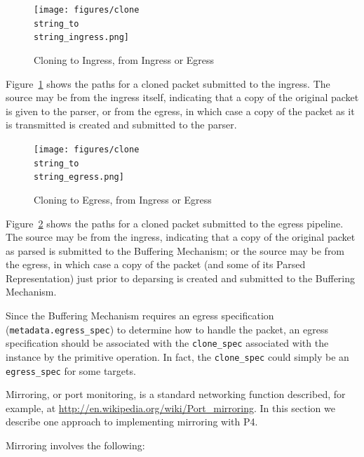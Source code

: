 \documentclass[12pt]{article}
\begin{document}

\begin{figure}[h!]
    \centering
    \texttt{[image: figures/clone\\string\_to\\string\_ingress.png]}
    \caption{Cloning to Ingress, from Ingress or Egress}
    \label{fig:ingressclone}
\end{figure}


Figure~\ref{fig:ingressclone} shows the paths for a cloned packet submitted to the ingress.  The 
source may be from the ingress itself, indicating that a copy of the original 
packet is given to the parser, or from the egress, in which case a copy of 
the packet as it is transmitted is created and submitted to the parser. 


\begin{figure}[h!]
    \centering
    \texttt{[image: figures/clone\\string\_to\\string\_egress.png]}
    \caption{Cloning to Egress, from Ingress or Egress}
    \label{fig:egressclone}
\end{figure}

Figure~\ref{fig:egressclone} shows the paths for a cloned packet submitted to the egress pipeline. 
 The source may be from the ingress, indicating that a copy of the original 
packet as parsed is submitted to the Buffering Mechanism; or the source may 
be from the egress, in which case a copy of the packet (and some of its Parsed 
Representation) just prior to deparsing is created and submitted to the Buffering 
Mechanism. 

Since the Buffering Mechanism requires an egress specification (\texttt{metadata.egress_spec}) 
to determine how to handle the packet, an egress specification should be associated 
with the \texttt{clone_spec} associated with the instance by the primitive operation. 
In fact, the \texttt{clone_spec} could simply be an \texttt{egress_spec} for some targets.


Mirroring, or port monitoring, is a standard networking function described, 
for example, at \url{http://en.wikipedia.org/wiki/Port_mirroring}.
In this section 
we describe one approach to implementing mirroring with P4.

Mirroring involves the following:
\end{document}
